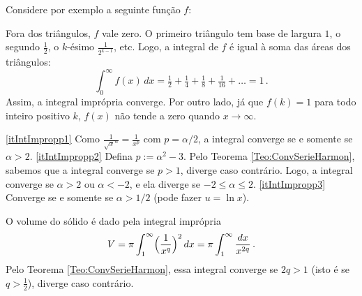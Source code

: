 \begin{Solution}{11.5}
Considere por exemplo a seguinte função $f$:
\begin{center}
\begin{bmlimage}\end{bmlimage}
\end{center}
Fora dos triângulos, $f$ vale zero.
O primeiro triângulo tem base de largura $1$, o segundo $\frac{1}{2}$, o
$k$-ésimo $\frac{1}{2^{k-1}}$, etc. Logo, a integral de $f$ é igual à soma
das áreas dos triângulos:
$$
\int_0^\infty f(x)\,dx=\tfrac12+\tfrac14+\tfrac18+\tfrac{1}{16}+\dots=1\,.
$$
Assim, a integral imprópria converge. Por outro lado, já que $f(k)=1$ para
todo inteiro positivo $k$, $f(x)$ não tende a zero quando $x\to \infty$.
\end{Solution}
\begin{Solution}{11.7}
\eqref{itIntImpropp1} Como $\frac{1}{\sqrt{x}^\alpha}=\frac{1}{x^{p}}$ com
$p=\alpha/2$, a integral
converge se e somente se $\alpha>2$.
\eqref{itIntImpropp2} Defina $p:=\alpha^2-3$.
Pelo Teorema \ref{Teo:ConvSerieHarmon}, sabemos que a integral converge se
$p>1$, diverge caso contrário. Logo, a integral converge se
$\alpha>2$ ou $\alpha<-2$, e ela diverge se $-2\leq \alpha\leq 2$.
\eqref{itIntImpropp3} Converge se e somente se $\alpha>1/2$ (pode fazer $u=\ln
x$).
\end{Solution}
\begin{Solution}{11.8}
O volume do sólido é dado pela integral imprópria
$$
V=\pi\int_1^\infty\Bigl(\frac{1}{x^q}\Bigr)^2\,dx=\pi\int_1^\infty\frac{dx}{
x^{2q}}\,.
$$
Pelo Teorema \ref{Teo:ConvSerieHarmon}, essa integral converge se $2q>1$ (isto
é se $q>\tfrac12$), diverge caso contrário.
\end{Solution}

